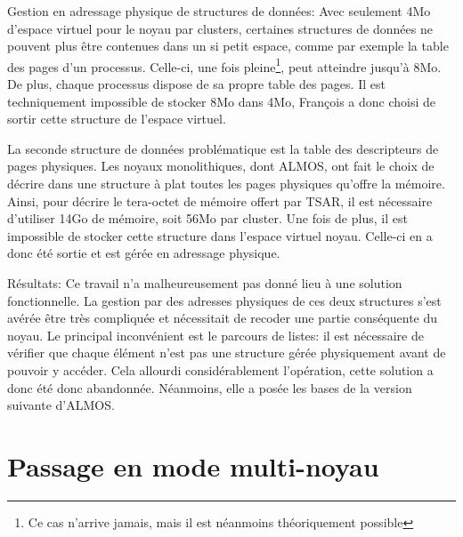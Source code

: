       \begin{paragraph}{Gestion en adressage physique de structures de données:}
        Avec seulement 4Mo d'espace virtuel pour le noyau par clusters,
        certaines structures de données ne pouvent plus être contenues dans un
        si petit espace, comme par exemple la table des pages d'un
        processus. Celle-ci, une fois pleine\footnote{Ce cas n'arrive jamais,
          mais il est néanmoins théoriquement possible}, peut atteindre jusqu'à
        8Mo. De plus, chaque processus dispose de sa propre table des pages. Il
        est techniquement impossible de stocker 8Mo dans 4Mo, François a donc
        choisi de sortir cette structure de l'espace virtuel.

        La seconde structure de données problématique est la table des
        descripteurs de pages physiques. Les noyaux monolithiques, dont ALMOS,
        ont fait le choix de décrire dans une structure à plat toutes les pages
        physiques qu'offre la mémoire. Ainsi, pour décrire le tera-octet de
        mémoire offert par TSAR, il est nécessaire d'utiliser 14Go de mémoire,
        soit 56Mo par cluster. Une fois de plus, il est impossible de stocker
        cette structure dans l'espace virtuel noyau. Celle-ci en a donc été
        sortie et est gérée en adressage physique.
      \end{paragraph}

      \begin{paragraph}{Résultats:}
        Ce travail n'a malheureusement pas donné lieu à une solution
        fonctionnelle. La gestion par des adresses physiques de ces deux
        structures s'est avérée être très compliquée et nécessitait de recoder
        une partie conséquente du noyau. Le principal inconvénient est le
        parcours de listes: il est nécessaire de vérifier que chaque élément
        n'est pas une structure gérée physiquement avant de pouvoir y
        accéder. Cela allourdi considérablement l'opération, cette solution a
        donc été donc abandonnée. Néanmoins, elle a posée les bases de la
        version suivante d'ALMOS.
      \end{paragraph}

      
  \section{Passage en mode multi-noyau}
  \label{sec:multi-noyau}

